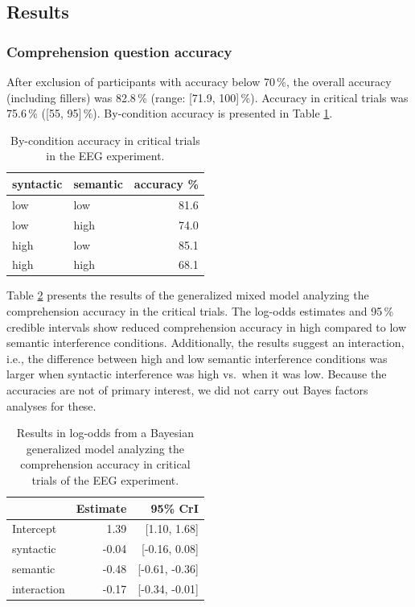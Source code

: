\documentclass[a4paper, man, floatsintext]{apa7}
\begin{document}
\subsection{Results}
\subsubsection{Comprehension question accuracy}
After exclusion of participants with accuracy below 70\,\%, the overall accuracy (including fillers) was 82.8\,\% (range: [71.9, 100]\,\%). Accuracy in critical trials was 75.6\,\% ([55, 95]\,\%). By-condition accuracy is presented in Table \ref{tab:eeg_acc}. 

\begin{table}[]
    \caption{By-condition accuracy in critical trials in the EEG experiment.}
    \label{tab:eeg_acc}
    \centering
    \begin{tabular}{llr}
    \toprule
    syntactic & semantic & accuracy \%\\
    \midrule
        low &  low & 81.6\\
        low &  high & 74.0\\
        high &  low & 85.1\\
        high &  high & 68.1\\
    \bottomrule
    \end{tabular}
\end{table}

Table \ref{tab:eeg_acc_mod} presents the results of the generalized mixed model analyzing the comprehension accuracy in the critical trials. The log-odds estimates and 95\,\% credible intervals show reduced comprehension accuracy in high compared to low semantic interference conditions. Additionally, the results suggest an interaction, i.e., the difference between high and low semantic interference conditions was larger when syntactic interference was high vs.\ when it was low. Because the accuracies are not of primary interest, we did not carry out Bayes factors analyses for these.

\begin{table}[]
    \caption{Results in log-odds from a Bayesian generalized model analyzing the comprehension accuracy in critical trials of the EEG experiment.}
    \label{tab:eeg_acc_mod}
    \centering
    \begin{tabular}{lrr}
    \toprule
    & Estimate &  95\% CrI  \\
    \midrule
Intercept& 1.39 &   [1.10, 1.68]\\
syntactic& -0.04 &  [-0.16, 0.08]\\
semantic&  -0.48 & [-0.61, -0.36]\\
interaction& -0.17&  [-0.34, -0.01]\\
    \bottomrule
    \end{tabular}
\end{table}
\end{document}
